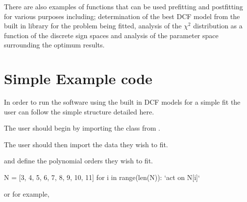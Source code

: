 \documentclass[letterpaper,10pt,english]{sphinxmanual}
\begin{document}
There are also examples of functions that can be used pre\sphinxhyphen{}fitting and post\sphinxhyphen{}fitting
for various purposes including; determination of the best DCF model from the
built in library for the problem being fitted, analysis of the \({\chi^2}\)
distribution as a function of the discrete sign spaces and analysis of the
parameter space surrounding the optimum results.


\section{Simple Example code}
\label{\detokenize{source/maxsmooth:simple-example-code}}
In order to run the  software using the built
in DCF models for a simple fit the user can follow the simple structure detailed here.

The user should begin by importing the  class from .

\begin{sphinxVerbatim}[commandchars=\\\{\}]
   
\end{sphinxVerbatim}

The user should then import the data they wish to fit.

\begin{sphinxVerbatim}[commandchars=\\\{\}]
   

  
  
\end{sphinxVerbatim}

and define the polynomial orders they wish to fit.

\begin{sphinxVerbatim}[commandchars=\\\{\}]
N = [3, 4, 5, 6, 7, 8, 9, 10, 11]
for i in range(len(N)):
    `act on N[i]`
\end{sphinxVerbatim}

or for example,

\begin{sphinxVerbatim}[commandchars=\\\{\}]
  
\end{sphinxVerbatim}
\end{document}
